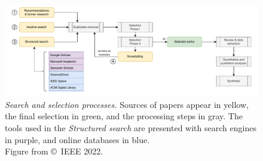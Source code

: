 \begin{figure}
  \centering
  \includegraphics[width=\textwidth]{figures/methodo-survey.drawio.pdf}
  \caption[
    Search and selection processes.
  ]{
    \emph{Search and selection processes.}
    Sources of papers appear in yellow, the final selection in green, and the processing steps in gray.
    The tools used in the \emph{Structured search} are presented with search engines in purple, and online databases in blue.\\
    Figure from \textcite{lavaur_tnsm_2022} \copyright~IEEE 2022.
    \label{fig:sota.methodo.original}
  }
\end{figure}

